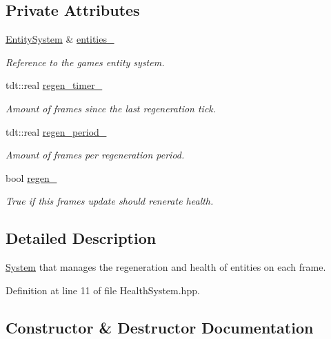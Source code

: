 \subsection*{Private Attributes}
\begin{DoxyCompactItemize}
\item 
\hyperlink{class_entity_system}{Entity\+System} \& \hyperlink{class_health_system_a954dfb60b0452f898186781bdc5be28c}{entities\+\_\+}
\begin{DoxyCompactList}\small\item\em Reference to the game\textquotesingle{}s entity system. \end{DoxyCompactList}\item 
tdt\+::real \hyperlink{class_health_system_aa17a75833ba090bd1c0d1cd77d694bca}{regen\+\_\+timer\+\_\+}
\begin{DoxyCompactList}\small\item\em Amount of frames since the last regeneration tick. \end{DoxyCompactList}\item 
tdt\+::real \hyperlink{class_health_system_a20a6116c6307492bc38e892bafaca0f3}{regen\+\_\+period\+\_\+}
\begin{DoxyCompactList}\small\item\em Amount of frames per regeneration period. \end{DoxyCompactList}\item 
bool \hyperlink{class_health_system_a80ce11376a9356ddb1edb010806655d4}{regen\+\_\+}
\begin{DoxyCompactList}\small\item\em True if this frame\textquotesingle{}s update should renerate health. \end{DoxyCompactList}\end{DoxyCompactItemize}


\subsection{Detailed Description}
\hyperlink{class_system}{System} that manages the regeneration and health of entities on each frame. 

Definition at line 11 of file Health\+System.\+hpp.



\subsection{Constructor \& Destructor Documentation}

